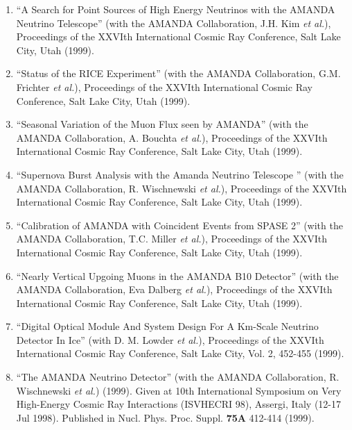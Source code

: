 \begin{enumerate}
\item ``A Search for Point Sources of High Energy Neutrinos
        with the   AMANDA Neutrino Telescope'' (with the
        AMANDA Collaboration, J.H. Kim   {\it et al.}),
        Proceedings of the XXVIth International Cosmic Ray
        Conference, Salt Lake City, Utah (1999).

\item ``Status of the RICE Experiment'' (with the AMANDA
        Collaboration,   G.M. Frichter {\it et al.}),
        Proceedings of the XXVIth International   Cosmic Ray
        Conference, Salt Lake City, Utah (1999).

\item ``Seasonal Variation of the Muon Flux seen by AMANDA''
        (with the   AMANDA Collaboration, A. Bouchta {\it et
        al.}), Proceedings of the XXVIth   International
        Cosmic Ray Conference, Salt Lake City, Utah (1999).

\item ``Supernova Burst Analysis with the Amanda Neutrino
        Telescope  '' (with the AMANDA Collaboration, R.
        Wischnewski {\it et al.}), Proceedings   of the
        XXVIth International Cosmic Ray Conference, Salt
        Lake City,   Utah (1999).

\item ``Calibration of AMANDA with Coincident Events from
        SPASE 2'' (with   the AMANDA Collaboration, T.C.
        Miller {\it et al.}), Proceedings of the   XXVIth
        International Cosmic Ray Conference, Salt Lake City,
        Utah   (1999).

\item ``Nearly Vertical Upgoing Muons in the AMANDA B10
        Detector'' (with   the AMANDA Collaboration, Eva
        Dalberg {\it et al.}), Proceedings of the   XXVIth
        International Cosmic Ray Conference, Salt Lake City,
        Utah   (1999).

\item ``Digital Optical Module And System Design For A
        Km-Scale Neutrino   Detector In Ice'' (with D. M.
        Lowder {\it et al.}), Proceedings of the   XXVIth
        International Cosmic Ray Conference, Salt Lake City,
        Vol. 2,   452-455 (1999).

\item ``The AMANDA Neutrino Detector'' (with the AMANDA
        Collaboration,   R. Wischnewski {\it et al.})
        (1999). Given at 10th International Symposium   on
        Very High-Energy Cosmic Ray Interactions (ISVHECRI
        98), Assergi,   Italy (12-17 Jul 1998).  Published
        in Nucl. Phys. Proc. Suppl. {\bf     75A} 412-414
        (1999).


\end{enumerate}
